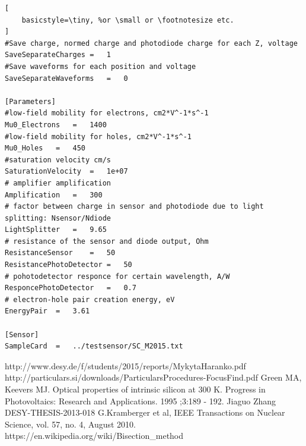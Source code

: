 \documentclass[12pt,oneside,notitlepage,abstracton,a4paper]{scrartcl}
\begin{document}
\begin{lstlisting}[
    basicstyle=\tiny, %or \small or \footnotesize etc.
]
#Save charge, normed charge and photodiode charge for each Z, voltage
SaveSeparateCharges	=	1
#Save waveforms for each position and voltage
SaveSeparateWaveforms	=	0

[Parameters]
#low-field mobility for electrons, cm2*V^-1*s^-1
Mu0_Electrons	=	1400
#low-field mobility for holes, cm2*V^-1*s^-1
Mu0_Holes	=	450
#saturation velocity cm/s
SaturationVelocity	=	1e+07
# amplifier amplification
Amplification	=	300
# factor between charge in sensor and photodiode due to light splitting: Nsensor/Ndiode
LightSplitter	=	9.65
# resistance of the sensor and diode output, Ohm
ResistanceSensor	=	50
ResistancePhotoDetector	=	50
# pohotodetector responce for certain wavelength, A/W
ResponcePhotoDetector	=	0.7
# electron-hole pair creation energy, eV
EnergyPair	=	3.61

[Sensor]
SampleCard	=	../testsensor/SC_M2015.txt
\end{lstlisting}

\clearpage

\begin{thebibliography}{99}
\begin{sloppypar}
 http://www.desy.de/f/students/2015/reports/MykytaHaranko.pdf
 http://particulars.si/downloads/ParticularsProcedures-FocusFind.pdf
 Green MA, Keevers MJ. Optical properties of intrinsic silicon at 300 K. Progress in Photovoltaics: Research and Applications. 1995 ;3:189 - 192.
 Jiaguo Zhang DESY-THESIS-2013-018
 G.Kramberger et al, IEEE Transactions on Nuclear Science, vol. 57, no. 4, August 2010.
 https://en.wikipedia.org/wiki/Bisection\_method
\end{sloppypar}
\end{thebibliography}
\end{document}
